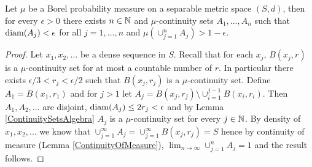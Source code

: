 \begin{lem}\label{ApproximatingWithContinuitySets}Let $\mu$ be a Borel probability measure on a separable metric space  $(S,d)$,  then for every $\epsilon > 0$ there exists $n \in \mathbb{N}$ and $\mu$-continuity sets $A_1, \dotsc, A_n$ such that $\operatorname*{diam}(A_j) < \epsilon$ for all $j=1, \dotsc,n$ and $\mu\left( \cup_{j=1}^n A_j \right) > 1 - \epsilon$.
\end{lem}
\begin{proof}
Let $x_1, x_2, \dotsc$ be a dense sequence in $S$.  Recall that for each $x_j$, $B(x_j, r)$ is a $\mu$-continuity set for at most a countable number of $r$.  In particular there exists $\epsilon/3 < r_j < \epsilon/2$ such that $B(x_j, r_j)$ is a $\mu$-continuity set.  Define $A_1 = B(x_1, r_1)$ and for $j > 1$ let $A_j = B(x_j, r_j) \setminus \cup_{i=1}^{j-1} B(x_i, r_i)$.  Then $A_1, A_2, \dotsc$ are disjoint, $\operatorname*{diam}(A_j) \leq 2 r_j < \epsilon$ and by Lemma \ref{ContinuitySetsAlgebra} $A_j$ is a $\mu$-continuity set for every $j \in \mathbb{N}$.  By density of $x_1, x_2, \dotsc$ we know that $\cup_{j=1}^\infty A_j = \cup_{j=1}^\infty B(x_j, r_j) = S$ hence by continuity of measure (Lemma \ref{ContinuityOfMeasure}), $\lim_{n \to \infty} \cup_{j=1}^n A_j = 1$ and the result follows.
\end{proof}

